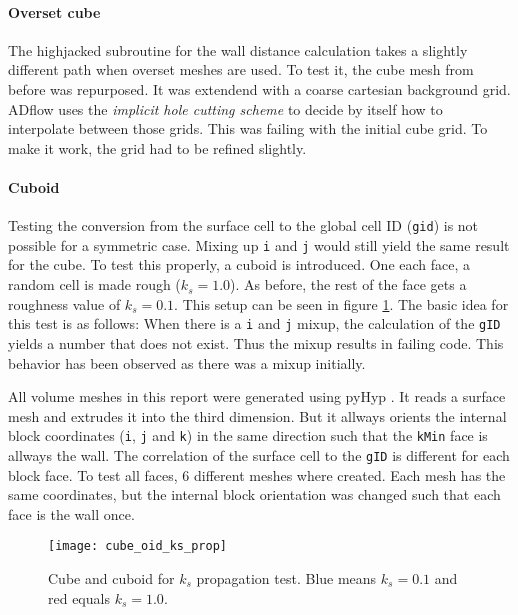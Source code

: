 \paragraph{Overset cube}
The highjacked subroutine for the wall distance calculation takes a slightly
different path when overset meshes are used. To test it, the cube mesh from
before was repurposed. It was extendend with a coarse cartesian  background
grid.  ADflow uses the \textit{implicit hole cutting scheme} to decide by itself
how to interpolate between those grids. This was failing with the initial
cube grid. To make it work, the grid had to be refined slightly.

\paragraph{Cuboid}
Testing the conversion from the surface cell to the global cell ID
(\texttt{gid}) is not possible for a symmetric case. Mixing up \texttt{i} and
\texttt{j} would still yield the same result for the cube. To test this
properly, a cuboid is introduced. One each face, a random cell is made rough
($k_{s} = 1.0$). As before, the rest of the face gets a roughness value of
$k_{s} = 0.1$. This setup can be seen in figure \ref{fig:cube_oid_ks_prop}.
The basic idea for this test is as follows: When there is a \texttt{i} and
\texttt{j} mixup, the calculation of the \texttt{gID} yields a number that does
not exist. Thus the mixup results in failing code. This behavior has been
observed as there was a mixup initially.

All volume meshes in this report were generated using pyHyp \cite{Secco2021}. It
reads a surface mesh and extrudes it into the third dimension. But it allways
orients the internal block coordinates (\texttt{i}, \texttt{j} and \texttt{k})
in the same direction such that the \texttt{kMin} face is allways the wall. The
correlation of the surface cell to the \texttt{gID} is different for each block
face. To test all faces, 6 different meshes where created. Each mesh has the
same coordinates, but the internal block orientation was changed such that each
face is the wall once.

\begin{figure}[H] \centering
\texttt{[image: cube\_oid\_ks\_prop]}
    \caption{Cube and cuboid for $k_{s}$ propagation test. Blue means
$k_{s} = 0.1$ and red equals $k_{s} =1.0$.}
    \label{fig:cube_oid_ks_prop}
\end{figure}

